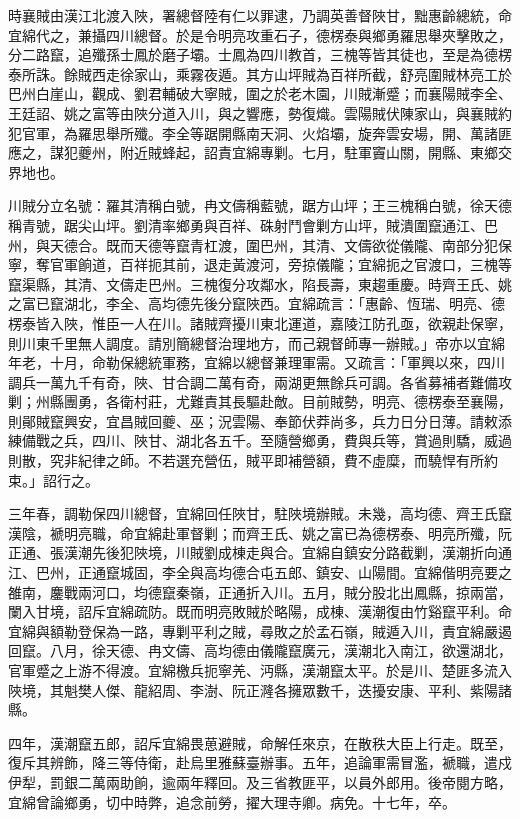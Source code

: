 \begin{pinyinscope}
時襄賊由漢江北渡入陜，署總督陸有仁以罪逮，乃調英善督陜甘，黜惠齡總統，命宜綿代之，兼攝四川總督。於是令明亮攻重石子，德楞泰與鄉勇羅思舉夾擊敗之，分二路竄，追殲孫士鳳於磨子壩。士鳳為四川教首，三槐等皆其徒也，至是為德楞泰所誅。餘賊西走徐家山，乘霧夜遁。其方山坪賊為百祥所截，舒亮圍賊林亮工於巴州白崖山，觀成、劉君輔破大寧賊，圍之於老木園，川賊漸蹙；而襄陽賊李全、王廷詔、姚之富等由陜分道入川，與之響應，勢復熾。雲陽賊伏陳家山，與襄賊約犯官軍，為羅思舉所殲。李全等踞開縣南天洞、火焰壩，旋奔雲安場，開、萬諸匪應之，謀犯夔州，附近賊蜂起，詔責宜綿專剿。七月，駐軍竇山關，開縣、東鄉交界地也。

川賊分立名號：羅其清稱白號，冉文儔稱藍號，踞方山坪；王三槐稱白號，徐天德稱青號，踞尖山坪。劉清率鄉勇與百祥、硃射鬥會剿方山坪，賊潰圍竄通江、巴州，與天德合。既而天德等竄青杠渡，圍巴州，其清、文儔欲從儀隴、南部分犯保寧，奪官軍餉道，百祥扼其前，退走黃渡河，旁掠儀隴；宜綿扼之官渡口，三槐等竄渠縣，其清、文儔走巴州。三槐復分攻鄰水，陷長壽，東趨重慶。時齊王氏、姚之富已竄湖北，李全、高均德先後分竄陜西。宜綿疏言：「惠齡、恆瑞、明亮、德楞泰皆入陜，惟臣一人在川。諸賊齊擾川東北運道，嘉陵江防孔亟，欲親赴保寧，則川東千里無人調度。請別簡總督治理地方，而己親督師專一辦賊。」帝亦以宜綿年老，十月，命勒保總統軍務，宜綿以總督兼理軍需。又疏言：「軍興以來，四川調兵一萬九千有奇，陜、甘合調二萬有奇，兩湖更無餘兵可調。各省募補者難備攻剿；州縣團勇，各衛村莊，尤難責其長驅赴敵。目前賊勢，明亮、德楞泰至襄陽，則鄖賊竄興安，宜昌賊回夔、巫；況雲陽、奉節伏莽尚多，兵力日分日薄。請敕添練備戰之兵，四川、陜甘、湖北各五千。至隨營鄉勇，費與兵等，賞過則驕，威過則散，究非紀律之師。不若選充營伍，賊平即補營額，費不虛糜，而驍悍有所約束。」詔行之。

三年春，調勒保四川總督，宜綿回任陜甘，駐陜境辦賊。未幾，高均德、齊王氏竄漢陰，褫明亮職，命宜綿赴軍督剿；而齊王氏、姚之富已為德楞泰、明亮所殲，阮正通、張漢潮先後犯陜境，川賊劉成棟走與合。宜綿自鎮安分路截剿，漢潮折向通江、巴州，正通竄城固，李全與高均德合屯五郎、鎮安、山陽間。宜綿偕明亮要之雒南，鏖戰兩河口，均德竄秦嶺，正通折入川。五月，賊分股北出鳳縣，掠兩當，闌入甘境，詔斥宜綿疏防。既而明亮敗賊於略陽，成棟、漢潮復由竹谿竄平利。命宜綿與額勒登保為一路，專剿平利之賊，尋敗之於孟石嶺，賊遁入川，責宜綿嚴遏回竄。八月，徐天德、冉文儔、高均德由儀隴竄廣元，漢潮北入南江，欲還湖北，官軍蹙之上游不得渡。宜綿檄兵扼寧羌、沔縣，漢潮竄太平。於是川、楚匪多流入陜境，其魁樊人傑、龍紹周、李澍、阮正漋各擁眾數千，迭擾安康、平利、紫陽諸縣。

四年，漢潮竄五郎，詔斥宜綿畏葸避賊，命解任來京，在散秩大臣上行走。既至，復斥其辨飾，降三等侍衛，赴烏里雅蘇臺辦事。五年，追論軍需冒濫，褫職，遣戍伊犁，罰銀二萬兩助餉，逾兩年釋回。及三省教匪平，以員外郎用。後帝閱方略，宜綿曾論鄉勇，切中時弊，追念前勞，擢大理寺卿。病免。十七年，卒。


\end{pinyinscope}
